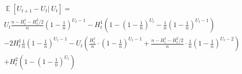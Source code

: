 \documentclass{article}
\DeclareMathOperator{\EX}{\mathbb{E}}%
\begin{document}
\begin{align*}
  &\EX[U_{t+1} - U_t|\ U_t] = \\ 
  &U_t \frac{n - H_t^1 - H_t^2/2}{n}\left(1 - \frac{1}{n}\right)^{U_t-1}
  - H_t^1 \left(1 - \left(1 - \frac{1}{n}\right)^{U_t} - \frac{1}{n}\left(1 -\frac{1}{n}\right)^{U_t-1}\right) \\
  &- 2 H_t^1 \frac{1}{n}\left(1 -\frac{1}{n}\right)^{U_t-1} -
  U_t \left(\frac{H_t^1}{n} \cdot \left(1 - \frac{1}{n} \right)^{U_t-1} + \frac{n - H_t^1 - H_t^2/2}{n} \cdot \frac{1}{n} \left(1 - \frac{1}{n} \right)^{U_t-2} \right) \\
  &+ H_t^2  \left(1 - \left(1 - \frac{1}{n}\right)^{U_t}\right) \\
\end{align*}

\end{document}
